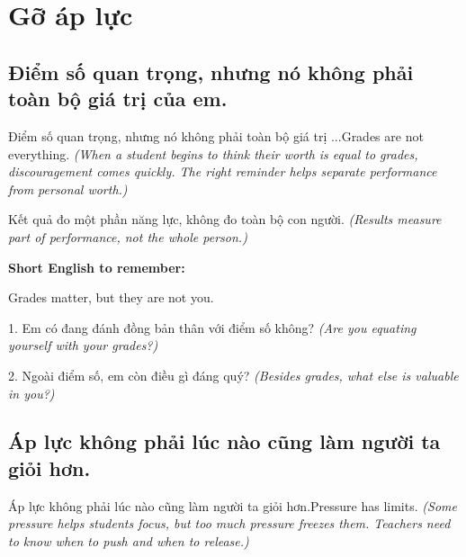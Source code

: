 \chapter{Gỡ áp lực}


\section{Điểm số quan trọng, nhưng nó không phải toàn bộ giá trị của em.}
\begin{truyen}{Điểm số quan trọng, nhưng nó không phải toàn bộ giá trị ...}{Grades are not everything.}
\textit{(When a student begins to think their worth is equal to grades, discouragement comes quickly. The right reminder helps separate performance from personal worth.)}
\end{truyen}

\begin{baihoc}
Kết quả đo một phần năng lực, không đo toàn bộ con người.
\textit{(Results measure part of performance, not the whole person.)}
\end{baihoc}

\begin{ghinhoanh}
\textbf{Short English to remember:}

Grades matter, but they are not you.

\end{ghinhoanh}

\begin{tuhocnhanh}
1. Em có đang đánh đồng bản thân với điểm số không? \textit{(Are you equating yourself with your grades?)}

2. Ngoài điểm số, em còn điều gì đáng quý? \textit{(Besides grades, what else is valuable in you?)}
\end{tuhocnhanh}
\ngancach


\section{Áp lực không phải lúc nào cũng làm người ta giỏi hơn.}
\begin{truyen}{Áp lực không phải lúc nào cũng làm người ta giỏi hơn.}{Pressure has limits.}
\textit{(Some pressure helps students focus, but too much pressure freezes them. Teachers need to know when to push and when to release.)}
\end{truyen}

